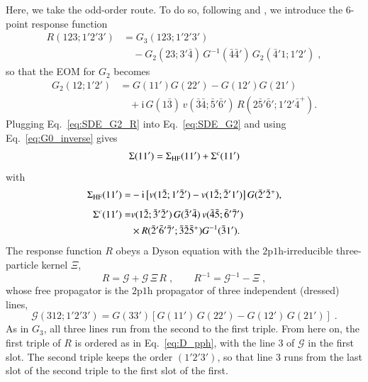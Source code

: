 \documentclass[aip,jcp,reprint,noshowkeys,superscriptaddress]{revtex4-1}
\newcommand{\ii}{\mathrm{i}}
\newcommand{\pph}{\text{2p1h}}
\begin{document}
Here, we take the odd-order route. To do so, following 
\citet{Winter1972} and \citet{Ethofer1969}, 
we introduce the 6-point response function
\begin{equation}
\begin{split}
    R(123;1'2'3')
    &=
    G_3(123;1'2'3')
    \\
    &\quad
    -
    G_2(23;3'\bar4)\,
    G^{-1}(\bar4\bar4')\,
    G_2(\bar4'1;1'2') \;,
\end{split}
\label{eq:response_function}
\end{equation}
so that the EOM for $G_2$ becomes
\begin{align}
G_2(12;1'2')
&=
G(11')G(22')
-
G(12')G(21')
\nonumber\\
&\quad+
\ii\,
G(1\bar3)\,
v(\bar3\bar4;\bar5'\bar6')\,
R(2\bar5'\bar6';1'2'\bar4^+).
\label{eq:SDE_G2_R}
\end{align}
Plugging Eq.~\eqref{eq:SDE_G2_R}
into Eq.~\eqref{eq:SDE_G2} and
using Eq.~\eqref{eq:G0_inverse} gives
\begin{equation}
\Sigma(11')
=
\Sigma_{\rm HF}(11')
+
\Sigma^{c}(11')
\label{eq:Sigma_split}
\end{equation}
with
\begin{align}
\Sigma_{\rm HF}(11')
= &
-\ii\,
\big[
v(1\bar2;1'\bar2')
-
v(1\bar2;\bar2'1')
\big]\,
G(\bar2'\bar2^+),
\label{eq:Sigma_HF}
\\[0.5em]
\Sigma^{c}(11')
= &
v(1\bar2;\bar3'\bar2')\,
G(\bar3'\bar4)\,
v(\bar4\bar5;\bar6'\bar7') \nonumber \\
& \times
R(\bar2'\bar6'\bar7';\bar3\bar2\bar5^+) 
G^{-1}(\bar3 1').
\label{eq:Sigma_3}
\end{align}
The response function $R$ obeys a Dyson equation with the
$\pph$-irreducible three-particle kernel $\Xi$,
\begin{equation}
R=\mathcal G+\mathcal G\,\Xi\,R \;,
\qquad
R^{-1}=\mathcal G^{-1}-\Xi \;,
\label{eq:R_dyson}
\end{equation}
whose free propagator is
the $\pph$ propagator of three independent (dressed) lines,
\begin{equation}
	\label{eq:D_pph}
\mathcal G(312;1'2'3')
=
G(33')
\left[
G(11')\,G(22')
-
G(12')\,G(21')
\right] \;.
\end{equation}
As in $G_3$, all
three lines run from the second to the first triple. From here on, the
first triple of $R$ is ordered as in Eq.~\eqref{eq:D_pph}, with the line 3 of $\mathcal G$ in the first slot. The second triple keeps the order $(1'2'3')$, so that line 3 runs from the last slot of the second triple to the first slot of the first.
\end{document}
